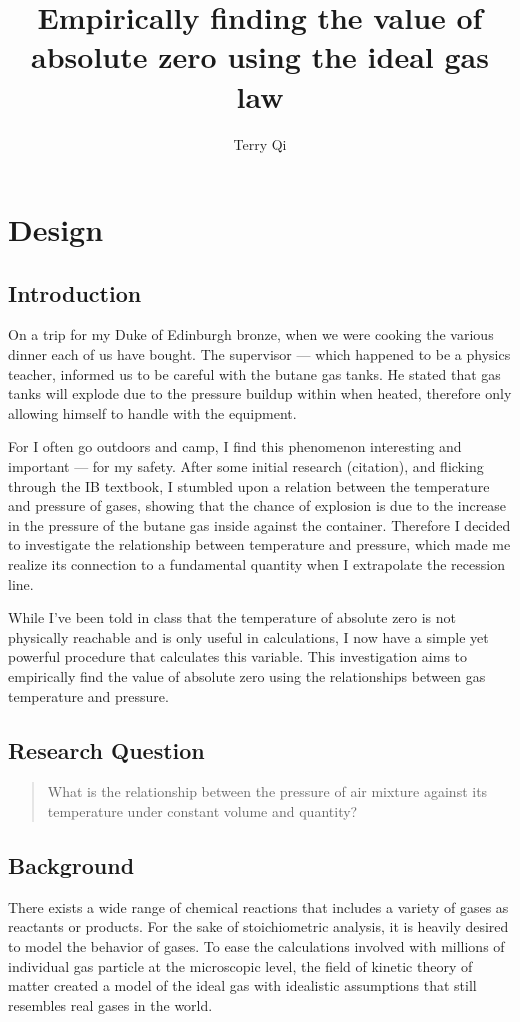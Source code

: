 \documentclass[a4paper,12pt]{article}
\title{Empirically finding the value of absolute zero using the ideal gas law}
\author{Terry Qi}
\begin{document}
\maketitle

\section{Design}
\subsection{Introduction}
On a trip for my Duke of Edinburgh bronze, when we were cooking the various dinner each of us have bought. The supervisor --- which happened to be a physics teacher, informed us to be careful with the butane gas tanks. He stated that gas tanks will explode due to the pressure buildup within when heated, therefore only allowing himself to handle with the equipment.

For I often go outdoors and camp, I find this phenomenon interesting and important --- for my safety. After some initial research (citation), and flicking through the IB textbook, I stumbled upon a relation between the temperature and pressure of gases, showing that the chance of explosion is due to the increase in the pressure of the butane gas inside against the container. Therefore I decided to investigate the relationship between temperature and pressure, which made me realize its connection to a fundamental quantity when I extrapolate the recession line. 

While I've been told in class that the temperature of absolute zero is not physically reachable and is only useful in calculations, I now have a simple yet powerful procedure that calculates this variable. This investigation aims to empirically find the value of absolute zero using the relationships between gas temperature and pressure.


\subsection{Research Question}
\begin{quote}
    What is the relationship between the pressure of air mixture against its temperature under constant volume and quantity?
\end{quote}

\subsection{Background}
There exists a wide range of chemical reactions that includes a variety of gases as reactants or products. For the sake of stoichiometric analysis, it is heavily desired to model the behavior of gases. To ease the calculations involved with millions of individual gas particle at the microscopic level, the field of kinetic theory of matter created a model of the ideal gas with idealistic assumptions that still resembles real gases in the world.
\end{document}
